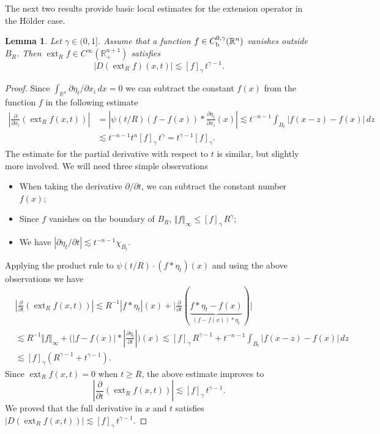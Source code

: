 \documentclass[intlimits,12pt,reqno]{amsart}
\newcommand{\bbbr}{\mathbb R}
\newcommand{\R}{\mathbb R}
\numberwithin{equation}{section}
\def\ext{\operatorname{ext}}
\newtheorem{lemma}[theorem]{Lemma}
\theoremstyle{definition}
\begin{document}
The next two results provide basic local estimates for the extension operator in the H\"older case.
\begin{lemma}
\label{T82}
Let $\gamma\in (0,1]$. Assume that a function $f\in C_{\rm b}^{0,\gamma}(\R^n)$ vanishes outside $B_R$. Then
$\ext_Rf\in C^\infty(\R^{n+1}_+)$ satisfies
$$
|D(\ext_Rf)(x,t)|\lesssim [f]_{\gamma}\, t^{\gamma-1}.
$$
\end{lemma}
\begin{proof}
Since $\int_{\bbbr^n}\partial\eta_t/\partial x_i\, dx =0$ we can subtract the constant $f(x)$ from 
the function $f$ in the following estimate
\begin{equation*}
\begin{split}
\left|\frac{\partial}{\partial x_i}(\ext_R f(x,t))\right|
&=
\left|\psi(t/R)(f-f(x))*\frac{\partial\eta_t}{\partial x_i}(x)\right|
\lesssim
t^{-n-1}\int_{B_t}|f(x-z)-f(x)|\, dz\\
&\lesssim
t^{-n-1}t^n[f]_{\gamma}\, t^\gamma 
= 
t^{\gamma-1}[f]_{\gamma}.
\end{split}
\end{equation*}
The estimate for the partial derivative with respect to $t$ is similar, but slightly more involved. We will need three simple observations
\begin{itemize}
\item When taking the derivative $\partial/\partial t$, we can subtract the constant number $f(x)$;
\item Since $f$ vanishes on the boundary of $B_R$, $\Vert f\Vert_\infty\leq [f]_{\gamma}\,R^\gamma$;
\item We have $|\partial\eta_t/\partial t|\lesssim t^{-n-1}\chi_{B_t}$.
\end{itemize}
Applying the product rule to $\psi(t/R)\cdot(f*\eta_t)(x)$ and using the above observations we have
\begin{align}
\label{eq10}
&\left|\frac{\partial}{\partial t}(\ext_R f(x,t))\right|
\lesssim
R^{-1}|f*\eta_t|(x)+\Big|\frac{\partial}{\partial t}(\underbrace{f*\eta_t-f(x)}_{(f-f(x))*\eta_t})\Big|\\
\nonumber
&\lesssim
R^{-1}\Vert f\Vert_\infty +\Big(|f-f(x)|*\left|\frac{\partial \eta_t}{\partial t}\right|\Big)(x)
\lesssim
[f]_{\gamma}\, R^{\gamma-1}+ t^{-n-1}\int_{B_t}|f(x-z)-f(x)|\, dz\\
\nonumber
&\lesssim 
[f]_{\gamma}(R^{\gamma-1}+t^{\gamma-1}).
\end{align}
Since $\ext_Rf(x,t)=0$ when $t\geq R$, the above estimate improves to
$$
\left|\frac{\partial}{\partial t}(\ext_R f(x,t))\right|\lesssim [f]_{\gamma}\, t^{\gamma-1}.
$$
We proved that the full derivative in $x$ and $t$ satisfies
$|D(\ext_R f(x,t))|\lesssim [f]_{\gamma}\,t^{\gamma-1}$.
\end{proof}
\end{document}
